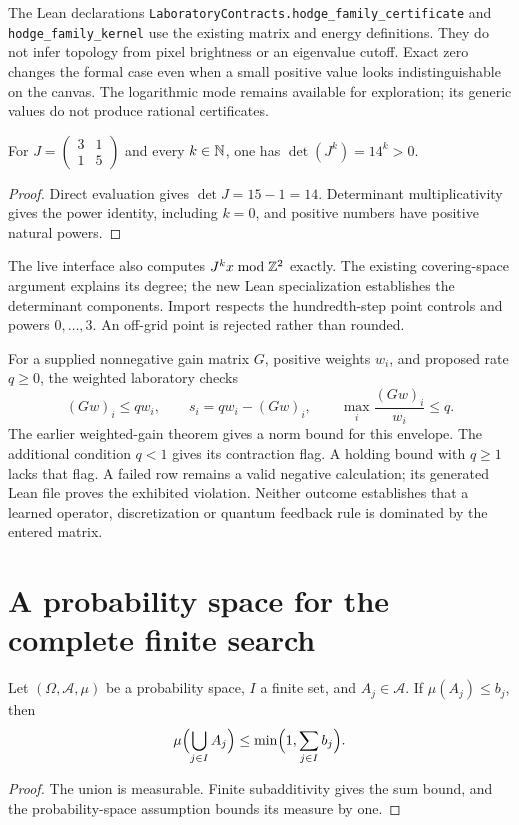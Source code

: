 The Lean declarations
\texttt{LaboratoryContracts.hodge\_family\_certificate} and
\texttt{hodge\_family\_kernel} use the existing matrix and energy definitions.
They do not infer topology from pixel brightness or an eigenvalue cutoff.
Exact zero changes the formal case even when a small positive value looks
indistinguishable on the canvas. The logarithmic mode remains available for
exploration; its generic values do not produce rational certificates.

\begin{proposition}
\label{prop:workbench-cover-certificate}
For \(J=\left(\begin{smallmatrix}3&1\\1&5\end{smallmatrix}\right)\)
and every \(k\in\mathbb{N}\), one has \(\det(J^k)=14^k>0\).
\end{proposition}
\begin{proof}
Direct evaluation gives \(\det J=15-1=14\). Determinant multiplicativity
gives the power identity, including \(k=0\), and positive numbers have positive
natural powers.
\end{proof}

The live interface also computes \(J^kx\bmod\mathbb{Z}^2\) exactly. The existing
covering-space argument explains its degree; the new Lean specialization
establishes the determinant components. Import respects the hundredth-step
point controls and powers \(0,\ldots,3\). An off-grid point is rejected
rather than rounded.

For a supplied nonnegative gain matrix \(G\), positive weights \(w_i\), and
proposed rate \(q\geq0\), the weighted laboratory checks
\[
 (Gw)_i\leq qw_i,\qquad s_i=qw_i-(Gw)_i,\qquad
 \max_i\frac{(Gw)_i}{w_i}\leq q.
\]
The earlier weighted-gain theorem gives a norm bound for this envelope.
The additional condition \(q<1\) gives its contraction flag. A holding
bound with \(q\geq1\) lacks that flag. A failed row remains a valid negative
calculation; its generated Lean file proves the exhibited violation. Neither
outcome establishes that a learned operator, discretization or quantum
feedback rule is dominated by the entered matrix.

\section{A probability space for the complete finite search}

\begin{proposition}
\label{prop:workbench-familywise-bound}
Let \((\Omega,\mathcal A,\mu)\) be a probability space, \(I\) a finite set,
and \(A_j\in\mathcal A\). If \(\mu(A_j)\leq b_j\), then
\[
 \mu\Bigl(\bigcup_{j\in I}A_j\Bigr)
 \leq \min\Bigl(1,\sum_{j\in I}b_j\Bigr).
\]
\end{proposition}
\begin{proof}
The union is measurable. Finite subadditivity gives the sum bound, and the
probability-space assumption bounds its measure by one.
\end{proof}

